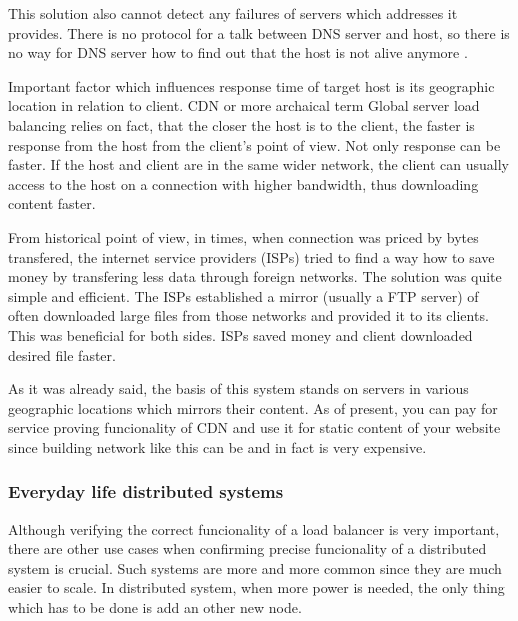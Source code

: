 \documentclass[
  master,
  biblatex,
  glossaries,
  index
]{kidiplom}
\begin{document}
This solution also cannot detect any failures of servers which addresses it provides. There is no protocol for a talk between DNS server and host, so there is no way for DNS server how to find out that the host is not alive anymore \cite{bib:slb}\cite{bib:practicallb}.


Important factor which influences response time of target host is its geographic location in relation to client. CDN or more archaical term Global server load balancing\cite{bib:slb} relies on fact, that the closer the host is to the client, the faster is response from the host from the client's point of view. Not only response can be faster. If the host and client are in the same wider network, the client can usually access to the host on a connection with higher bandwidth, thus downloading content faster\cite{bib:practicallb}.

From historical point of view, in times, when connection was priced by bytes transfered, the internet service providers (ISPs) tried to find a way how to save money by transfering less data through foreign networks. The solution was quite simple and efficient. The ISPs established a mirror (usually a FTP server) of often downloaded large files from those networks and provided it to its clients. This was beneficial for both sides. ISPs saved money and client downloaded desired file faster.

As it was already said, the basis of this system stands on servers in various geographic locations which mirrors their content. As of present, you can pay for service proving funcionality of CDN and use it for static content of your website since building network like this can be and in fact is very expensive.

\subsubsection{Everyday life distributed systems}

Although verifying the correct funcionality of a load balancer is very important, there are other use cases when confirming precise funcionality of a distributed system is crucial. Such systems are more and more common since they are much easier to scale. In distributed system, when more power is needed, the only thing which has to be done is add an other new node. %

\end{document}
